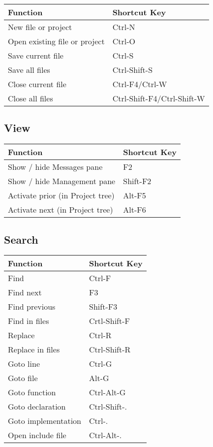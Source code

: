 \begin{tabular}{|l|l|}\hline
Function 		&	Shortcut Key\\ \hline
New file or project 	&	Ctrl-N\\ \hline
Open existing file or project &	Ctrl-O\\ \hline
Save current file 	&	Ctrl-S\\ \hline
Save all files 		&	Ctrl-Shift-S\\ \hline
Close current file 	&	Ctrl-F4/Ctrl-W\\ \hline
Close all files 	&	Ctrl-Shift-F4/Ctrl-Shift-W\\ \hline
\end{tabular}

\subsection{View}

\begin{tabular}{|l|l|}\hline
Function 		&	Shortcut Key\\ \hline
Show / hide Messages pane	&	F2\\ \hline
Show / hide Management pane 	&	Shift-F2\\ \hline
Activate prior (in Project tree) & 	Alt-F5\\ \hline
Activate next (in Project tree)  &	Alt-F6\\ \hline
\end{tabular}

\subsection{Search}

\begin{tabular}{|l|l|}\hline
Function 	&	Shortcut Key\\ \hline
Find 		&	Ctrl-F\\ \hline
Find next 	&	F3\\ \hline
Find previous 	&	Shift-F3\\ \hline
Find in files 	&	Crtl-Shift-F\\ \hline
Replace 	&	Ctrl-R\\ \hline
Replace in files &	Ctrl-Shift-R\\ \hline
Goto line 	&	Ctrl-G\\ \hline
Goto file 	&	Alt-G\\ \hline
Goto function 	&	Ctrl-Alt-G\\ \hline
Goto declaration & Ctrl-Shift-.\\ \hline
Goto implementation & Ctrl-.\\ \hline
Open include file & Ctrl-Alt-.\\ \hline
\end{tabular}

